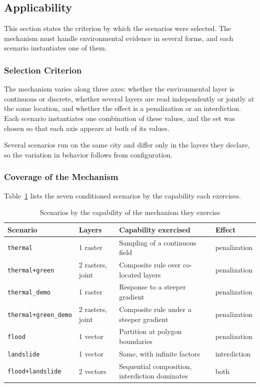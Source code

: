 \subsection{Applicability}
\label{subsec:applicability}

This section states the criterion by which the scenarios were selected. The mechanism must handle environmental evidence in several forms, and each scenario instantiates one of them.

\subsubsection{Selection Criterion}

The mechanism varies along three axes: whether the environmental layer is continuous or discrete, whether several layers are read independently or jointly at the same location, and whether the effect is a penalization or an interdiction. Each scenario instantiates one combination of these values, and the set was chosen so that each axis appears at both of its values.

Several scenarios run on the same city and differ only in the layers they declare, so the variation in behavior follows from configuration.

\subsubsection{Coverage of the Mechanism}

Table~\ref{tab:cenarios} lists the seven conditioned scenarios by the capability each exercises.

\begin{table}[H]
\centering
\footnotesize
\caption{Scenarios by the capability of the mechanism they exercise}
\label{tab:cenarios}
\begin{tabularx}{\linewidth}{|l|l|X|l|}
\hline
\textbf{Scenario} & \textbf{Layers} & \textbf{Capability exercised} & \textbf{Effect} \\
\hline
\texttt{thermal} & 1 raster & Sampling of a continuous field & penalization \\
\texttt{thermal+green} & 2 rasters, joint & Composite rule over co-located layers & penalization \\
\texttt{thermal\_demo} & 1 raster & Response to a steeper gradient & penalization \\
\texttt{thermal+green\_demo} & 2 rasters, joint & Composite rule under a steeper gradient & penalization \\
\texttt{flood} & 1 vector & Partition at polygon boundaries & penalization \\
\texttt{landslide} & 1 vector & Same, with infinite factors & interdiction \\
\texttt{flood+landslide} & 2 vectors & Sequential composition, interdiction dominates & both \\
\hline
\end{tabularx}
\end{table}

